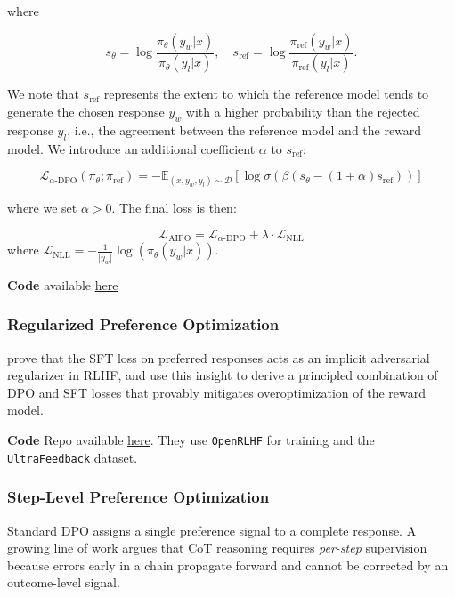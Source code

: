 where

$$
    s_\theta = \log \frac{\pi_\theta (y_w | x)}{\pi_\theta (y_l | x)}, \quad s_{\text{ref}} = \log \frac{\pi_{\text{ref}} (y_w | x)}{\pi_{\text{ref}} (y_l | x)}.
$$

We note that $s_{\text{ref}}$ represents the extent to which the reference model tends to generate the chosen response $y_w$ with a higher probability than the rejected response $y_l$, i.e., the agreement between the reference model and the reward model. We introduce an additional coefficient $\alpha$ to $s_{\text{ref}}$:

$$
    \mathcal{L}_{\alpha\text{-DPO}}(\pi_\theta; \pi_{\text{ref}}) = -\mathbb{E}_{(x,y_w,y_l) \sim \mathcal{D}} \left[ \log \sigma \left( \beta(s_\theta - (1 + \alpha)s_{\text{ref}}) \right) \right]
$$

where we set $\alpha > 0$. The final loss is then:

$$
    \mathcal{L}_{\text{AIPO}} = \mathcal{L}_{\alpha\text{-DPO}} + \lambda \cdot \mathcal{L}_{\text{NLL}}
$$
where $\mathcal{L}_{\text{NLL}} = -\frac{1}{|y_w|}\log(\pi_\theta(y_w | x))$.

\vspace{1em}
\textbf{Code} available \href{https://github.com/bytedance/AIPO}{here}

\subsubsection{Regularized Preference Optimization}

\autocite{liu2024provablymitigatingoveroptimizationrlhf} prove that the SFT loss on preferred responses acts as an implicit adversarial regularizer in RLHF, and use this insight to derive a principled combination of DPO and SFT losses that provably mitigates overoptimization of the reward model.

\vspace{1em}
\textbf{Code} Repo available \href{https://github.com/YSLIU627/Regularized-Preference-Optimization}{here}. They use \texttt{OpenRLHF} for training and the \texttt{UltraFeedback} dataset.

\subsubsection{Step-Level Preference Optimization}

Standard DPO assigns a single preference signal to a complete response. A growing line of work argues that CoT reasoning requires \emph{per-step} supervision because errors early in a chain propagate forward and cannot be corrected by an outcome-level signal.


